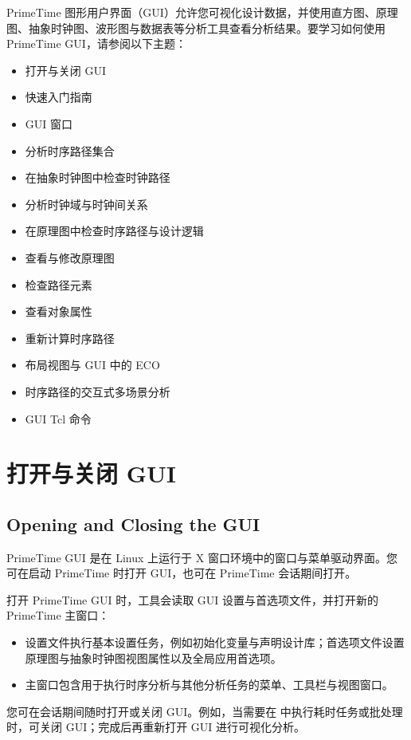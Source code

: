 \label{chap:gui}

PrimeTime 图形用户界面（GUI）允许您可视化设计数据，并使用直方图、原理图、抽象时钟图、波形图与数据表等分析工具查看分析结果。要学习如何使用 PrimeTime GUI，请参阅以下主题：
\begin{itemize}
  \item 打开与关闭 GUI
  \item 快速入门指南
  \item GUI 窗口
  \item 分析时序路径集合
  \item 在抽象时钟图中检查时钟路径
  \item 分析时钟域与时钟间关系
  \item 在原理图中检查时序路径与设计逻辑
  \item 查看与修改原理图
  \item 检查路径元素
  \item 查看对象属性
  \item 重新计算时序路径
  \item 布局视图与 GUI 中的 ECO
  \item 时序路径的交互式多场景分析
  \item GUI Tcl 命令
\end{itemize}

\section{打开与关闭 GUI}
\subsection*{Opening and Closing the GUI}

PrimeTime GUI 是在 Linux 上运行于 X 窗口环境中的窗口与菜单驱动界面。您可在启动 PrimeTime 时打开 GUI，也可在 PrimeTime 会话期间打开。

打开 PrimeTime GUI 时，工具会读取 GUI 设置与首选项文件，并打开新的 PrimeTime 主窗口：
\begin{itemize}
  \item 设置文件执行基本设置任务，例如初始化变量与声明设计库；首选项文件设置原理图与抽象时钟图视图属性以及全局应用首选项。
  \item 主窗口包含用于执行时序分析与其他分析任务的菜单、工具栏与视图窗口。
\end{itemize}

您可在会话期间随时打开或关闭 GUI。例如，当需要在  中执行耗时任务或批处理时，可关闭 GUI；完成后再重新打开 GUI 进行可视化分析。

